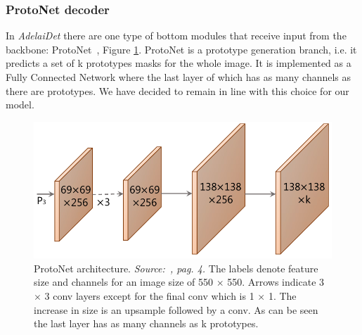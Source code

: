 \documentclass[10pt,twocolumn,letterpaper]{article}
\begin{document}
\subsubsection{ProtoNet decoder}
In \textit{AdelaiDet} there are one type of bottom modules that receive input from the backbone: ProtoNet~\cite{protonet}, Figure \ref{fig:protonet}. ProtoNet is a prototype generation branch, i.e. it predicts a set of k prototypes masks for the whole image. It is implemented as a Fully Connected Network where the last layer of which has as many channels as there are prototypes. %
We have decided to remain in line with this choice for our model.
\begin{figure}[H]
\centering
  \includegraphics[width=0.65\linewidth]{./image/protonet.png} 
  \caption{ProtoNet architecture. \textit{Source:~\cite{protonet}, pag. 4.}
The labels denote feature size and channels for an image size of 550 $\times$ 550. Arrows indicate 3 $\times$ 3 conv layers except for the final conv which is 1 $\times$ 1. The increase in size is an upsample followed by a conv. As can be seen the last layer has as many channels as k prototypes.}
  \label{fig:protonet}
\noindent
\end{figure}
\end{document}
